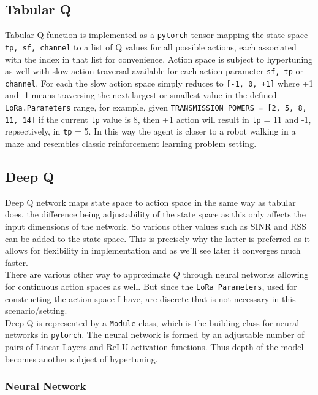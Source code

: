 \subsection{Tabular Q}
Tabular Q function is implemented as a \texttt{pytorch} 
tensor mapping the state space \texttt{tp, sf, channel} to 
a list of Q values for all possible actions, each associated
with the index in that list for convenience. Action space 
is subject to hypertuning as well with slow action traversal
available for each action parameter \texttt{sf, tp} or 
\texttt{channel}. For each the slow action space simply 
reduces to \texttt{[-1, 0, +1]} where +1 and -1 means traversing 
the next largest or smallest value in the defined \texttt{LoRa.Parameters} range, for example, given 
\texttt{TRANSMISSION\_POWERS = [2, 5, 8, 11, 14]} if the current 
\texttt{tp} value is 8, then +1 action will result in \texttt{tp} = 11 and -1, repsectively, in \texttt{tp} = 5. In this way 
the agent is closer to a robot walking in a maze and resembles classic reinforcement learning problem setting.

\subsection{Deep Q}
Deep Q network maps state space to action space in the same way
as tabular does, the difference being adjustability of the state
space as this only affects the input dimensions of the network.
So various other values such as SINR and RSS can be added to the 
state space. This is precisely why the latter is preferred 
as it allows for flexibility in implementation and as we'll 
see later it converges much faster. \\

There are various other way to approximate $Q$ through neural
networks allowing for continuous action spaces as well.
But since the \texttt{LoRa Parameters}, used for constructing
the action space I have, are discrete that is not necessary
in this scenario/setting.\\

Deep Q is represented by a \texttt{Module} class, which is 
the building class for neural networks in \texttt{pytorch}.
The neural network is formed by an adjustable number of 
pairs of Linear Layers and ReLU activation functions.
Thus depth of the model becomes another subject of 
hypertuning. \\



\subsubsection{Neural Network}

